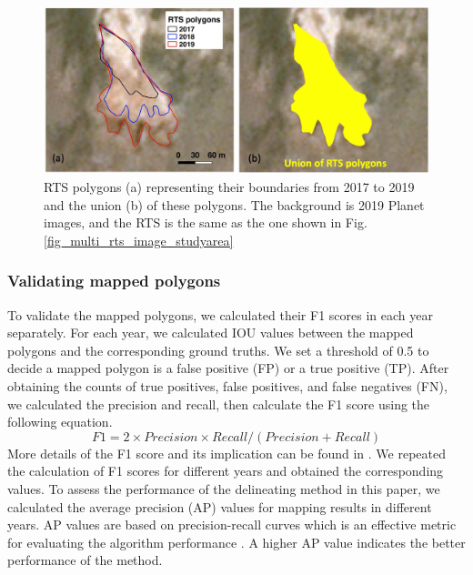 \documentclass[authoryear,preprint,review,12pt]{elsarticle}
\begin{document}
\begin{figure} 
	\centering
	\includegraphics[width=14cm]{figs/rts_expanding_example_trim.jpg}
	\caption{RTS polygons (a) representing their boundaries from 2017 to 2019 and the union (b) of these polygons. The background is 2019 Planet images, and the RTS is the same as the one shown in Fig. \ref{fig_multi_rts_image_studyarea}}
	\label{fig_rts_expanding}
\end{figure}


\subsubsection{Validating mapped polygons}
\label{sec_validate_mapped_polygons}

To validate the mapped polygons, we calculated their F1 scores in each year separately. 
For each year, we calculated IOU values between the mapped polygons and the corresponding ground truths. 
We set a threshold of 0.5 to decide a mapped polygon is a false positive (FP) or a true positive (TP).
After obtaining the counts of true positives, false positives, and false negatives (FN), we calculated the precision and recall, then calculate the F1 score using the following equation. 
\begin{equation}
F1=2 \times Precision \times Recall / (Precision + Recall)
\label{equ_f1score}
\end{equation}
More details of the F1 score and its implication can be found in \cite{huang2020using}.
We repeated the calculation of F1 scores for different years and obtained the corresponding values. 
To assess the performance of the delineating method in this paper, we calculated the average precision (AP) values for mapping results in different years. %
AP values are based on precision-recall curves which is an effective metric for evaluating the algorithm performance \citep{huang2020using}.
A higher AP value indicates the better performance of the method. 
\end{document}

